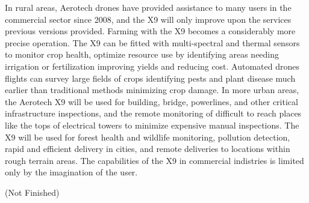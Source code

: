 In rural areas, Aerotech drones have provided assistance to many users in the commercial sector since 2008, and the X9 will only improve upon the services previous versions provided. Farming with the X9 becomes a considerably more precise operation. The X9 can be fitted with multi-spectral and thermal sensors to monitor crop health, optimize resource use by identifying areas needing irrigation or fertilization improving yields and reducing cost. Automated drones flights can survey large fields of crops identifying pests and plant disease much earlier than traditional methods minimizing crop damage. 
In more urban areas, the Aerotech X9 will be used for building, bridge, powerlines, and other critical infrastructure inspections, and the remote monitoring of difficult to reach places like the tops of electrical towers to minimize expensive manual inspections. The X9 will be used for forest health and wildlife monitoring, pollution detection, rapid and efficient delivery in cities, and remote deliveries to locations within rough terrain areas. The capabilities of the X9 in commercial indistries is limited only by the imagination of the user. 

(Not Finished)